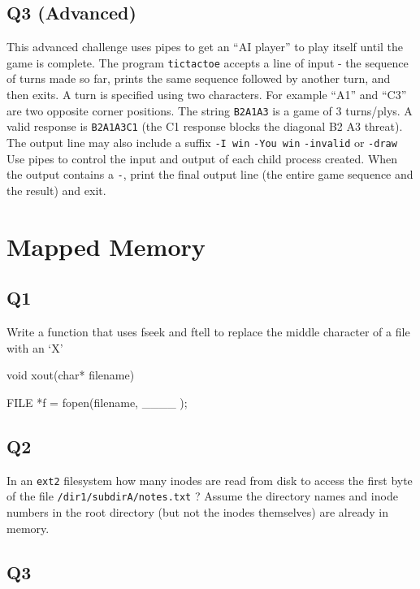 \subsection{Q3 (Advanced)}\label{q3-advanced}

This advanced challenge uses pipes to get an ``AI player'' to play itself until the game is complete. The program \texttt{tictactoe} accepts a line of input - the sequence of turns made so far, prints the same sequence followed by another turn, and then exits. A turn is specified using two characters. For example ``A1'' and ``C3'' are two opposite corner positions. The string \texttt{B2A1A3} is a game of 3 turns/plys. A valid response is \texttt{B2A1A3C1} (the C1 response blocks the diagonal B2 A3 threat). The output line may also include a suffix \texttt{-I\ win} \texttt{-You\ win} \texttt{-invalid} or \texttt{-draw} Use pipes to control the input and output of each child process created. When the output contains a \texttt{-}, print the final output line (the entire game sequence and the result) and exit.

\section{Mapped Memory}

\subsection{Q1}\label{q1-4}

Write a function that uses fseek and ftell to replace the middle character of a file with an `X'

\begin{code}[language=C]
void xout(char* filename) {
  FILE *f = fopen(filename, ____ );
  


}
\end{code}

\subsection{Q2}\label{q2-4}

In an \texttt{ext2} filesystem how many inodes are read from disk to access the first byte of the file \texttt{/dir1/subdirA/notes.txt} ? Assume the directory names and inode numbers in the root directory (but not the inodes themselves) are already in memory.

\subsection{Q3}\label{q3-3}

